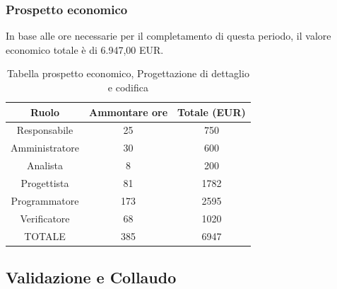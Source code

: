 \subsubsection{Prospetto economico}
In base alle ore necessarie per il completamento di questa periodo, il valore economico totale è di 6.947,00 EUR.
\begin{table}[h]
\caption{Tabella prospetto economico, Progettazione di dettaglio e codifica}  
\begin{center}
\begin{tabular}{ |c|c|c|  }
 \hline
 Ruolo 		& Ammontare ore 	& Totale (EUR)\\
 	\hline
 \hline
 	Responsabile	& 25 		& 750\\
	Amministratore	& 30		& 600\\
	Analista		& 8 	& 200\\
	Progettista		& 81		& 1782\\
	Programmatore	& 173		&2595 \\
	Verificatore	& 68 	& 1020\\
 \hline\hline
 TOTALE		& 385		& 6947\\
  \hline
\end{tabular}
\end{center}
\end{table}
\newpage
\subsection{Validazione e Collaudo}
